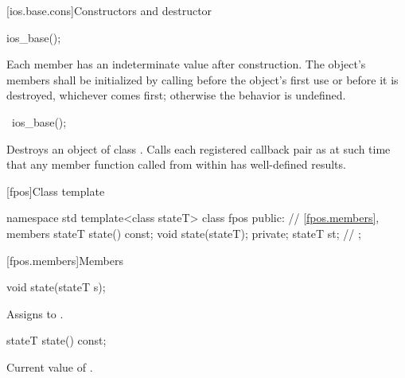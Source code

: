 [ios.base.cons]{Constructors and destructor}

%
\begin{itemdecl}
ios_base();
\end{itemdecl}

\begin{itemdescr}
\pnum
\effects
Each
member has an indeterminate value after construction.
The object's members shall be initialized by calling
before the object's first use or before it is destroyed, whichever comes first; otherwise
the behavior is undefined.
\end{itemdescr}

%
\begin{itemdecl}
~ios_base();
\end{itemdecl}

\begin{itemdescr}
\pnum
\effects
Destroys an object of class
.
Calls each registered callback pair
 as
at such time that any
member function called from within
has well-defined results.
\end{itemdescr}

[fpos]{Class template }

%
\begin{codeblock}
namespace std {
  template<class stateT> class fpos {
  public:
    // \ref{fpos.members}, members
    stateT state() const;
    void state(stateT);
  private;
    stateT st; // \expos
  };
}
\end{codeblock}

[fpos.members]{Members}

%
\begin{itemdecl}
void state(stateT s);
\end{itemdecl}

\begin{itemdescr}
\pnum
\effects
Assigns  to .
\end{itemdescr}

%
\begin{itemdecl}
stateT state() const;
\end{itemdecl}

\begin{itemdescr}
\pnum
\returns
Current value of .
\end{itemdescr}


